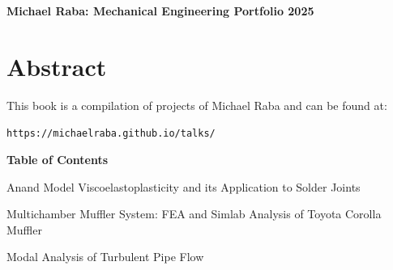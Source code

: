 \documentclass[12pt,openright]{book}
\author{Michael Raba}
\date{\today}
\title{}
\begin{document}
\frontmatter

\newpage
\thispagestyle{empty}
\begin{center}
\vspace*{4cm}
{\Huge \textbf{Michael Raba: Mechanical Engineering Portfolio 2025}}\\
\vfill
\end{center}
\cleardoublepage

\thispagestyle{empty}
\section*{Abstract}
This book is a compilation of projects of Michael Raba and can be found at:

\texttt{https://michaelraba.github.io/talks/}
\cleardoublepage

\thispagestyle{empty}
\begin{center}
\Large \textbf{Table of Contents}
\end{center}
\vspace{1cm}

\noindent
Anand Model Viscoelastoplasticity and its Application to Solder Joints 

Multichamber Muffler System: FEA and Simlab Analysis of Toyota Corolla Muffler 

Modal Analysis of Turbulent Pipe Flow 
\cleardoublepage

\mainmatter
\end{document}

